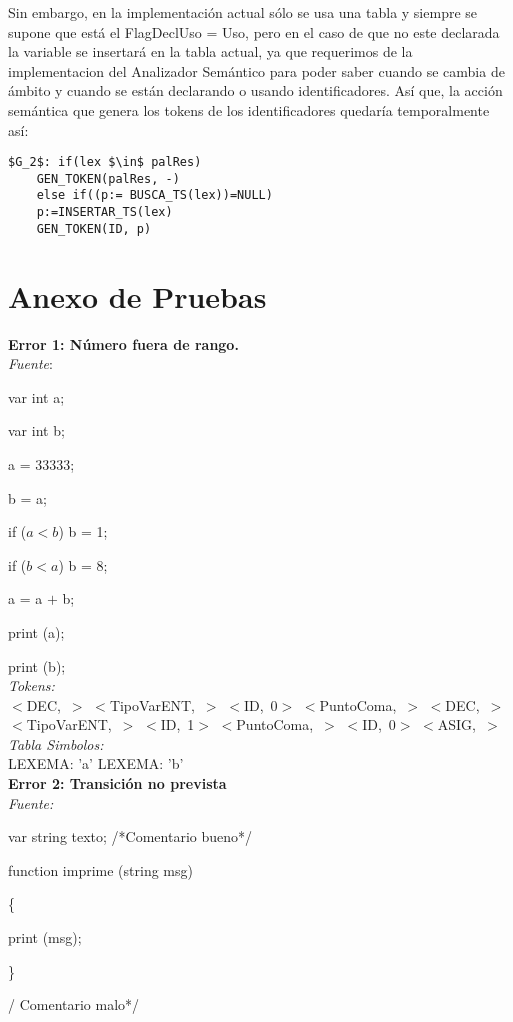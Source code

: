 \documentclass[a4paper, 12pt]{article}
\begin{document}
Sin embargo, en la implementación actual sólo se usa una tabla y siempre se supone que está el FlagDeclUso = Uso, pero en el caso de que no este declarada la variable se insertará en la tabla actual, ya que requerimos de la implementacion del Analizador Semántico para poder saber cuando se cambia de ámbito y cuando se están declarando o usando identificadores. Así que, la acción semántica que genera los tokens de los identificadores quedaría temporalmente así:
\begin{lstlisting}
$G_2$: if(lex $\in$ palRes)
	GEN_TOKEN(palRes, -)
    else if((p:= BUSCA_TS(lex))=NULL)
	p:=INSERTAR_TS(lex)
	GEN_TOKEN(ID, p)
\end{lstlisting}

\section{Anexo de Pruebas}

\textbf{Error 1: Número fuera de rango.} \\ 
\emph{Fuente}:


var int a;


var int b;


a = 33333;


b = a;


 if ($a  <  b$) b  =  1; 
 
 
if ($b  <  a$) b  =  8;


 a = a  $+$  b;
 
 
print (a);


print (b);\medskip\\
\emph{Tokens:}\\ 
\mbox{$<$DEC, $>$}
\mbox{$<$TipoVarENT, $>$}
\mbox{$<$ID, 0$>$}
\mbox{$<$PuntoComa, $>$}
\mbox{$<$DEC, $>$}
\mbox{$<$TipoVarENT, $>$}
\mbox{$<$ID, 1$>$}
\mbox{$<$PuntoComa, $>$}
\mbox{$<$ID, 0$>$}
\mbox{$<$ASIG, $>$}\medskip\\
\emph{Tabla Simbolos:}\\
  LEXEMA: 'a'
  LEXEMA: 'b'\bigskip \\
\textbf{Error 2: Transición no prevista}\medskip\\
\emph{Fuente:} 


var string texto; /*Comentario bueno*/

 function imprime (string msg)
 
\{

	print (msg);
	
\} 

/ Comentario malo*/
\end{document}
